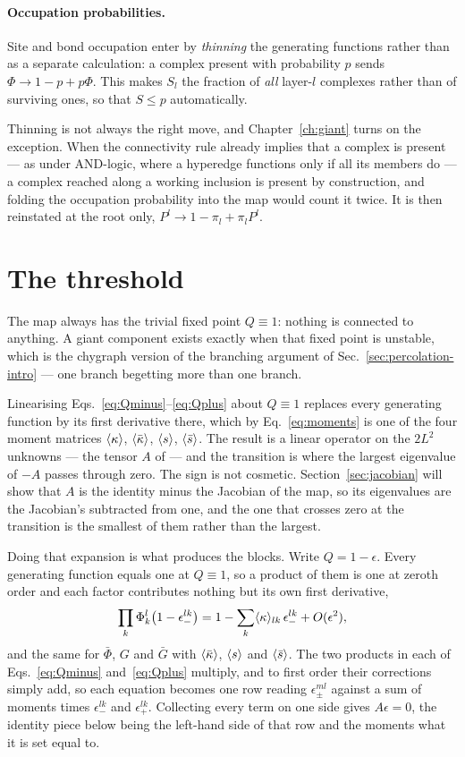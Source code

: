 \paragraph{Occupation probabilities.} Site and bond occupation enter by
\emph{thinning} the generating functions rather than as a separate calculation:
a complex present with probability $p$ sends $\Phi\to1-p+p\Phi$. This makes
$S_{l}$ the fraction of \emph{all} layer-$l$ complexes rather than of surviving
ones, so that $S\le p$ automatically.

Thinning is not always the right move, and Chapter~\ref{ch:giant} turns on the
exception. When the connectivity rule already
implies that a complex is present --- as under AND-logic, where a hyperedge
functions only if all its members do --- a complex reached along a working
inclusion is present by construction, and folding the occupation probability
into the map would count it twice. It is then reinstated at the root only,
$P^{l}\to1-\pi_{l}+\pi_{l}P^{l}$.

\section{The threshold}
\label{sec:threshold}

The map always has the trivial fixed point $Q\equiv1$: nothing is connected to
anything. A giant component exists exactly when that fixed point is unstable,
which is the chygraph version of the branching argument of
Sec.~\ref{sec:percolation-intro} --- one branch begetting more than one branch.

Linearising Eqs.~\eqref{eq:Qminus}--\eqref{eq:Qplus} about $Q\equiv1$ replaces
every generating function by its first derivative there, which by
Eq.~\eqref{eq:moments} is one of the four moment matrices $\langle \kappa \rangle$,
$\langle \bar\kappa \rangle$, $\langle s \rangle$, $\langle \bar s \rangle$. The result is a linear operator on the
$2L^{2}$ unknowns --- the tensor $A$ of \citet{vazquez2023pre} --- and the
transition is where the largest eigenvalue of $-A$ passes through zero. The
sign is not cosmetic. Section~\ref{sec:jacobian} will show that $A$ is the
identity minus the Jacobian of the map, so its eigenvalues are the Jacobian's
subtracted from one, and the one that crosses zero at the transition is the
smallest of them rather than the largest.

Doing that expansion is what produces the blocks. Write $Q=1-\epsilon$. Every
generating function equals one at $Q\equiv1$, so a product of them is one at
zeroth order and each factor contributes nothing but its own first derivative,
\[
  \prod_{k}\Phi^{l}_{k}\bigl(1-\epsilon^{lk}_{-}\bigr)
    =1-\sum_{k}\langle \kappa \rangle_{lk}\,\epsilon^{lk}_{-}+O(\epsilon^{2}),
\]
and the same for $\bar\Phi$, $G$ and $\bar G$ with $\langle \bar\kappa \rangle$, $\langle s \rangle$ and
$\langle \bar s \rangle$. The two products in each of Eqs.~\eqref{eq:Qminus}
and~\eqref{eq:Qplus} multiply, and to first order their corrections simply add,
so each equation becomes one row reading $\epsilon^{ml}_{\pm}$ against a sum of
moments times $\epsilon^{lk}_{-}$ and $\epsilon^{lk}_{+}$. Collecting every term
on one side gives $A\epsilon=0$, the identity piece below being the left-hand
side of that row and the moments what it is set equal to.

